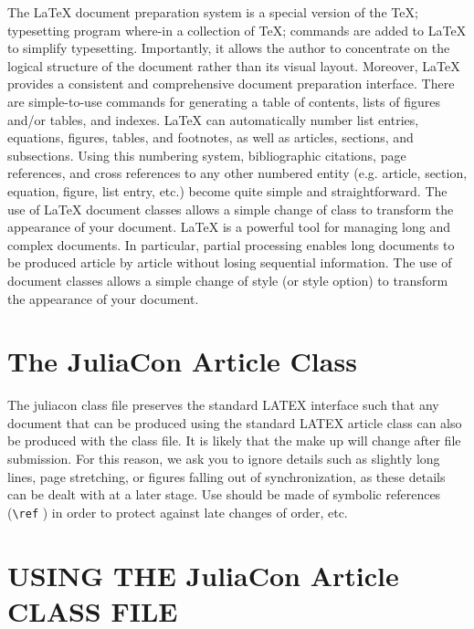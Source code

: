 \documentclass{juliacon}
\begin{document}
The \LaTeX{} document preparation system is a special version of the
\TeX; typesetting program where-in a collection of \TeX; commands
are added to \LaTeX{} to simplify typesetting. Importantly, it allows
the author to concentrate on the logical structure of the document
rather than its visual layout.\vskip 6pt
Moreover, \LaTeX{} provides a consistent and comprehensive document
preparation interface. There are simple-to-use commands for
generating a table of contents, lists of figures and/or tables, and indexes.
\LaTeX{} can automatically number list entries, equations, figures,
tables, and footnotes, as well as articles, sections, and subsections.
Using this numbering system, bibliographic citations, page
references, and cross references to any other numbered entity (e.g.
article, section, equation, figure, list entry, etc.) become quite simple
and straightforward. The use of \LaTeX{} document classes allows
a simple change of class to transform the appearance of your document.\vskip 6pt
\LaTeX{} is a powerful tool for managing long and complex documents.
In particular, partial processing enables long documents to
be produced article by article without losing sequential information.
The use of document classes allows a simple change of style
(or style option) to transform the appearance of your document.



\section{The JuliaCon Article Class}
\label{sec:documentclass}
%
The juliacon class file preserves the standard LATEX{} interface such
that any document that can be produced using the standard LATEX{}
article class can also be produced with the class file.\vskip 6pt
It is likely that the make up will change after file submission. For
this reason, we ask you to ignore details such as slightly long lines,
page stretching, or figures falling out of synchronization, as these
details can be dealt with at a later stage.\vskip 6pt
Use should be made of symbolic references (\verb|\ref| ) in order to
protect against late changes of order, etc.

\section{USING THE JuliaCon Article CLASS FILE}
\end{document}
